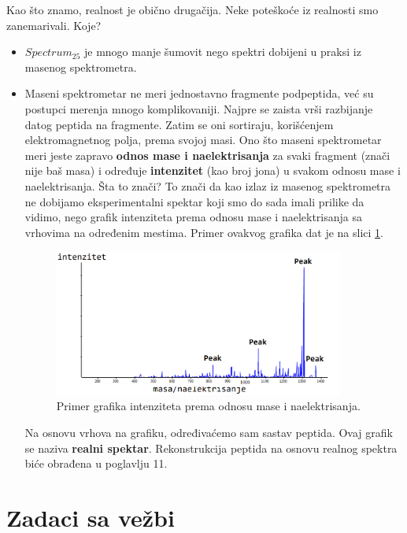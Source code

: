Kao što znamo, realnost je obično drugačija. Neke poteškoće iz realnosti smo zanemarivali. Koje?
\begin{itemize}
	\item $Spectrum_{25}$ je mnogo manje šumovit nego spektri dobijeni u praksi iz masenog spektrometra.
	
	\item Maseni spektrometar ne meri jednostavno fragmente podpeptida, već su postupci merenja mnogo komplikovaniji. Najpre se zaista vrši razbijanje datog peptida na fragmente. Zatim se oni sortiraju, korišćenjem elektromagnetnog polja, prema svojoj masi. Ono što maseni spektrometar meri jeste zapravo \textbf{odnos mase i naelektrisanja} za svaki fragment (znači nije baš masa) i određuje \textbf{intenzitet} (kao broj jona) u svakom odnosu mase i naelektrisanja. Šta to znači? To znači da kao izlaz iz masenog spektrometra ne dobijamo eksperimentalni spektar koji smo do sada imali prilike da vidimo, nego grafik intenziteta prema odnosu mase i naelektrisanja sa vrhovima na određenim mestima. Primer ovakvog grafika dat je na slici \ref{slika:intenzitet}.
	\begin{figure}[h!]
	\centering
	\includegraphics[width=0.9\textwidth]{poglavlja/4/slike/intenzitet.png}
	\caption{Primer grafika intenziteta prema odnosu mase i naelektrisanja.}
	\label{slika:intenzitet}
\end{figure}
	Na osnovu vrhova na grafiku, određivaćemo sam sastav peptida. Ovaj grafik se naziva \textbf{realni spektar}. Rekonstrukcija peptida na osnovu realnog spektra biće obrađena u poglavlju 11.
	
\end{itemize}

\newpage
\section{Zadaci sa vežbi}
\setexamplecodestyle

